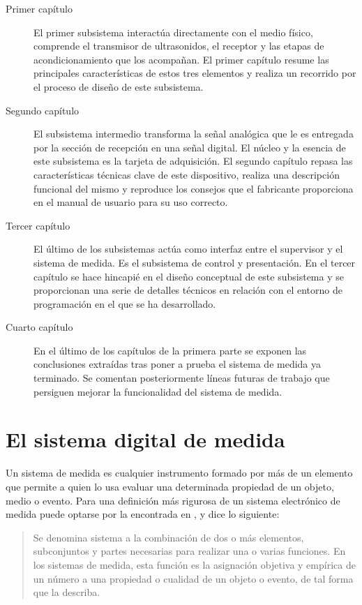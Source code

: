 \begin{description}
    \item[Primer capítulo] El primer subsistema interactúa directamente con
	el medio físico, comprende el transmisor de ultrasonidos, el
	receptor y las etapas de acondicionamiento que los acompañan. El
	primer capítulo resume las principales características de estos
	tres elementos y realiza un recorrido por el proceso de diseño de
	este subsistema.
    \item[Segundo capítulo] El subsistema intermedio transforma la señal
	analógica que le es entregada por la sección de recepción en una
	señal digital. El núcleo y la esencia de este subsistema es la
	tarjeta de adquisición. El segundo capítulo repasa las
	características técnicas clave de este dispositivo, realiza una
	descripción funcional del mismo y reproduce los consejos que el
	fabricante proporciona en el manual de usuario para su uso
	correcto.
    \item[Tercer capítulo] El último de los subsistemas actúa como interfaz
	entre el supervisor y el sistema de medida. Es el subsistema de
	control y presentación. En el tercer capítulo se hace hincapié en
	el diseño conceptual de este subsistema y se proporcionan una serie
	de detalles técnicos en relación con el entorno de programación en
	el que se ha desarrollado.
    \item[Cuarto capítulo] En el último de los capítulos de la primera
	parte se exponen las conclusiones extraídas tras poner a prueba el
	sistema de medida ya terminado. Se comentan posteriormente líneas
	futuras de trabajo que persiguen mejorar la funcionalidad del
	sistema de medida.
\end{description}


\section*{El sistema digital de medida}

Un sistema de medida es cualquier instrumento formado por más de un
elemento que permite a quien lo usa evaluar una determinada propiedad de un
objeto, medio o evento. Para una definición más rigurosa de un sistema
electrónico de medida puede optarse por la encontrada en
\citet{pallas2004sas}, y dice lo siguiente:

{\small\begin{quotation}
    Se denomina sistema a la combinación de dos o más elementos,
    subconjuntos y partes necesarias para realizar una o varias
    funciones. En los sistemas de medida, esta función es la asignación
    objetiva y empírica de un número a una propiedad o cualidad de un
    objeto o evento, de tal forma que la describa.
\end{quotation}}

